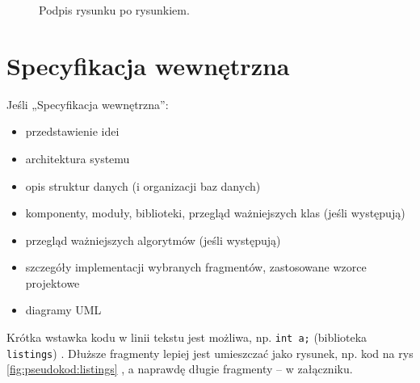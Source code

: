 \documentclass[a4paper,twoside,12pt]{book}
\begin{document}
 
\begin{figure}
\centering
{}
\caption{Podpis rysunku po rysunkiem.}
\label{fig:2}
\end{figure}



\chapter{Specyfikacja wewnętrzna}
\label{ch:05}


Jeśli „Specyfikacja wewnętrzna”:
\begin{itemize}
\item przedstawienie idei
\item architektura systemu
\item opis struktur danych (i organizacji baz danych)
\item komponenty, moduły, biblioteki, przegląd ważniejszych klas (jeśli występują)
\item przegląd ważniejszych algorytmów (jeśli występują)
\item szczegóły implementacji wybranych fragmentów, zastosowane wzorce projektowe
\item diagramy UML
\end{itemize}



Krótka wstawka kodu w linii tekstu jest możliwa, np.  \lstinline|int a;| (biblioteka \texttt{listings})%
. 
Dłuższe fragmenty lepiej jest umieszczać jako rysunek, np. kod na rys \ref{fig:pseudokod:listings}%
, a naprawdę długie fragmenty – w załączniku.
\end{document}
